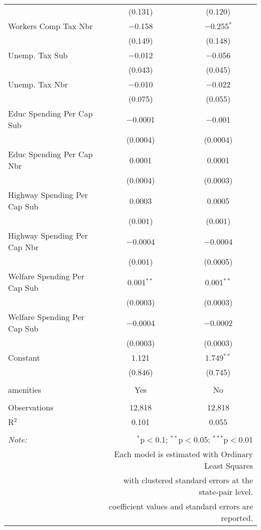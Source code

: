 \begin{table}[!htbp]
\begin{tabular}{@{\extracolsep{5pt}}lcc}
  & (0.131) & (0.120) \\ 
  Workers Comp Tax Nbr & $-$0.158 & $-$0.255$^{*}$ \\ 
  & (0.149) & (0.148) \\ 
  Unemp. Tax Sub & $-$0.012 & $-$0.056 \\ 
  & (0.043) & (0.045) \\ 
  Unemp. Tax Nbr & $-$0.010 & $-$0.022 \\ 
  & (0.075) & (0.055) \\ 
  Educ Spending Per Cap Sub & $-$0.0001 & $-$0.001 \\ 
  & (0.0004) & (0.0004) \\ 
  Educ Spending Per Cap Nbr & 0.0001 & 0.0001 \\ 
  & (0.0004) & (0.0003) \\ 
  Highway Spending Per Cap Sub & 0.0003 & 0.0005 \\ 
  & (0.001) & (0.001) \\ 
  Highway Spending Per Cap Nbr & $-$0.0004 & $-$0.0004 \\ 
  & (0.001) & (0.0005) \\ 
  Welfare Spending Per Cap Sub & 0.001$^{**}$ & 0.001$^{**}$ \\ 
  & (0.0003) & (0.0003) \\ 
  Welfare Spending Per Cap Sub & $-$0.0004 & $-$0.0002 \\ 
  & (0.0003) & (0.0003) \\ 
  Constant & 1.121 & 1.749$^{**}$ \\ 
  & (0.846) & (0.745) \\ 
 \hline \\[-1.8ex] 
amenities & Yes & No \\ 
\hline \\[-1.8ex] 
Observations & 12,818 & 12,818 \\ 
R$^{2}$ & 0.101 & 0.055 \\ 
\hline 
\hline \\[-1.8ex] 
\textit{Note:}  & \multicolumn{2}{r}{$^{*}$p$<$0.1; $^{**}$p$<$0.05; $^{***}$p$<$0.01} \\ 
 & \multicolumn{2}{r}{Each model is estimated with Ordinary Least Squares} \\ 
 & \multicolumn{2}{r}{with clustered standard errors at the state-pair level.} \\ 
 & \multicolumn{2}{r}{coefficient values and standard errors are reported.} \\ 
\end{tabular} 
\end{table} 
